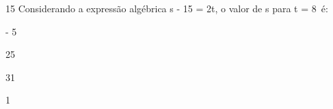

\num{15} Considerando a expressão algébrica s - 15 = 2t, o valor de s
para t = 8\  é:

\begin{escolha}
\item - 5
\item 25
\item 31
\item 1
\end{escolha}



\pagebreak

\mbox{}

